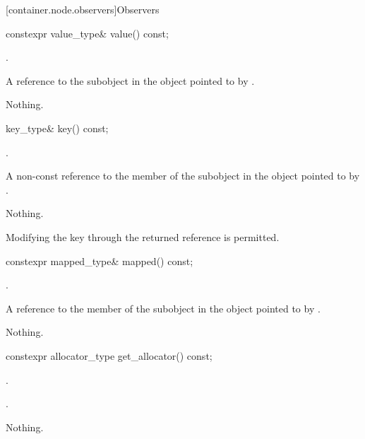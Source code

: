 [container.node.observers]{Observers}

\begin{itemdecl}
constexpr value_type& value() const;
\end{itemdecl}

\begin{itemdescr}
\pnum
\expects
{}.

\pnum
\returns
A reference to the  subobject in the
 object pointed to by .

\pnum
\throws
Nothing.
\end{itemdescr}

\begin{itemdecl}
key_type& key() const;
\end{itemdecl}

\begin{itemdescr}
\pnum
\expects
{}.

\pnum
\returns
A non-const reference to the  member of the
 subobject in the  object
pointed to by .

\pnum
\throws
Nothing.

\pnum
\remarks
Modifying the key through the returned reference is permitted.
\end{itemdescr}

\begin{itemdecl}
constexpr mapped_type& mapped() const;
\end{itemdecl}

\begin{itemdescr}
\pnum
\expects
{}.

\pnum
\returns
A reference to the  member of the
 subobject in the  object
pointed to by .

\pnum
\throws
Nothing.
\end{itemdescr}

\begin{itemdecl}
constexpr allocator_type get_allocator() const;
\end{itemdecl}

\begin{itemdescr}
\pnum
\expects
{}.

\pnum
\returns
{}.

\pnum
\throws
Nothing.
\end{itemdescr}


